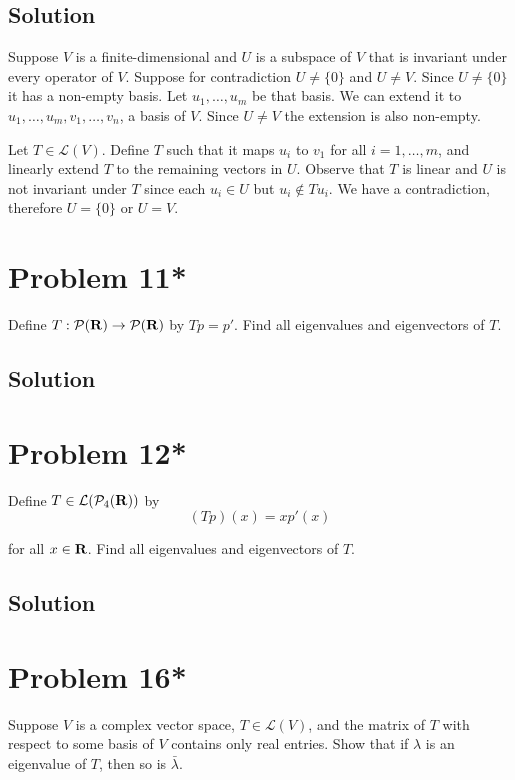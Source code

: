 \documentclass{article}
\begin{document}
\subsection*{Solution}

Suppose $V$ is a finite-dimensional and $U$ is a subspace of $V$ that is invariant under every operator of $V$. Suppose for contradiction $U\neq\{0\}$ and $U\neq V$. Since $U\neq \{0\}$ it has a non-empty basis. Let $u_1,\ldots,u_m$ be that basis. We can extend it to $u_1,\ldots,u_m, v_1,\ldots,v_n$, a basis of $V$. Since $U\neq V$ the extension is also non-empty.

\vs

Let $T\in\mathcal{L}(V)$. Define $T$ such that it maps $u_i$ to $v_1$ for all $i=1,\ldots,m$, and linearly extend $T$ to the remaining vectors in $U$. Observe that $T$ is linear and $U$ is not invariant under $T$ since each $u_i\in U$ but $u_i\not\in Tu_i$. We have a contradiction, therefore $U=\{0\}$ or $U=V$.

\section*{Problem 11*}
Define $T:\mathcal{P}(\mathbf{R})\to\mathcal{P}(\mathbf{R})$ by $Tp=p'$. Find all eigenvalues and eigenvectors of $T$.

\subsection*{Solution}

\section*{Problem 12*}
Define $T\in\mathcal{L}(\mathcal{P}_4(\mathbf{R}))$ by
\[(Tp)(x)=xp'(x)\]

for all $x\in\mathbf{R}$. Find all eigenvalues and eigenvectors of $T$.

\subsection*{Solution}

\section*{Problem 16*}
Suppose $V$ is a complex vector space, $T\in\mathcal{L}(V)$, and the matrix of $T$ with respect to some basis of $V$ contains only real entries. Show that if $\lambda$ is an eigenvalue of $T$, then so is $\bar{\lambda}$.
\end{document}
